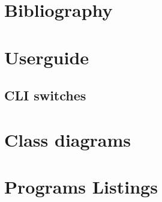 \documentclass[11pt]{report}
\begin{document}
\chapter{Bibliography}

\begin{appendices}

\chapter{Userguide}
\section{CLI switches}

\chapter{Class diagrams}

\chapter{Programs Listings}

\end{appendices}
\end{document}
